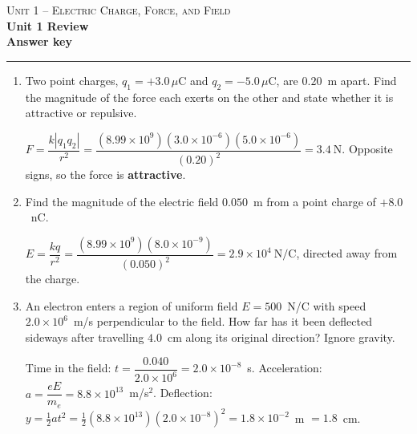 \documentclass[11pt,letterpaper]{article}
\begin{document}
{\small\textsc{Unit 1 -- Electric Charge, Force, and Field}}\\[2pt]{\Large\bfseries Unit 1 Review}\\[8pt]\textbf{Answer key}\\[4pt]\hrule\vspace{10pt}{\small\itshape Placeholder worksheet for the site prototype. Free for classroom use.}\vspace{6pt}
\begin{enumerate}[leftmargin=*,itemsep=10pt]
\item Two point charges, $q_1 = +3.0\,\mu\text{C}$ and $q_2 = -5.0\,\mu\text{C}$, are $0.20$~m apart. Find the magnitude of the force each exerts on the other and state whether it is attractive or repulsive.
\begin{answer}$F = \dfrac{k|q_1 q_2|}{r^2} = \dfrac{(8.99\times10^{9})(3.0\times10^{-6})(5.0\times10^{-6})}{(0.20)^2} = 3.4\ \text{N}$. Opposite signs, so the force is \textbf{attractive}.\end{answer}
\item Find the magnitude of the electric field $0.050$~m from a point charge of $+8.0$~nC.
\begin{answer}$E = \dfrac{kq}{r^2} = \dfrac{(8.99\times10^{9})(8.0\times10^{-9})}{(0.050)^2} = 2.9\times10^{4}\ \text{N/C}$, directed away from the charge.\end{answer}
\item An electron enters a region of uniform field $E = 500$~N/C with speed $2.0\times10^{6}$~m/s perpendicular to the field. How far has it been deflected sideways after travelling $4.0$~cm along its original direction? Ignore gravity.
\begin{answer}Time in the field: $t = \dfrac{0.040}{2.0\times10^{6}} = 2.0\times10^{-8}$~s. Acceleration: $a = \dfrac{eE}{m_e} = 8.8\times10^{13}$~m/s$^2$. Deflection: $y = \tfrac12 a t^2 = \tfrac12(8.8\times10^{13})(2.0\times10^{-8})^2 = 1.8\times10^{-2}$~m $= 1.8$~cm.\end{answer}
\end{enumerate}
\end{document}
